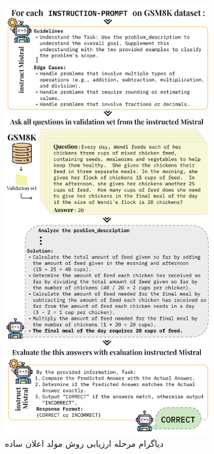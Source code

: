  \begin{figure}[!t]
	\centering
	\includegraphics[width=90mm]{images/evaluation}
	\caption{دیاگرام مرحله ارزیابی روش مولد اعلان ساده}
	\label{fig_evaluation}
\end{figure}
























